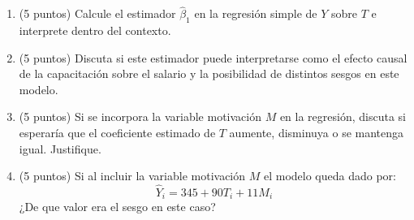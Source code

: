 \documentclass[10pt,a4paper]{article}
\begin{document}
\begin{enumerate}
    \begin{enumerate}
        \item (5 puntos) Calcule el estimador \(\hat{\beta}_1\) en la regresión simple de \(Y\) sobre \(T\) e interprete dentro del contexto.
        \item (5 puntos) Discuta si este estimador puede interpretarse como el efecto causal de la capacitación sobre el salario y la posibilidad de distintos sesgos en este modelo.
        \item (5 puntos) Si se incorpora la variable motivación \(M\) en la regresión, discuta si esperaría que el coeficiente estimado de \(T\) aumente, disminuya o se mantenga igual. Justifique.
        \item (5 puntos) Si al incluir la variable motivación \(M\) el modelo queda dado por:
        $$\hat{Y}_i = 345 + 90T_i + 11M_i$$
        ¿De que valor era el sesgo en este caso?
    \end{enumerate}










\end{enumerate}
\end{document}
